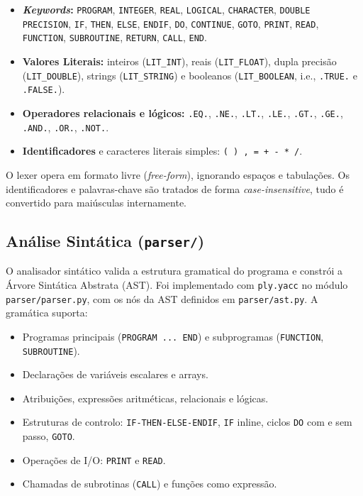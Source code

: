 \documentclass[11pt, a4paper, fleqn]{article}
\begin{document}
\begin{itemize}
    \item \textbf{\textit{Keywords}:} \texttt{PROGRAM}, \texttt{INTEGER}, \texttt{REAL}, \texttt{LOGICAL}, \texttt{CHARACTER}, \texttt{DOUBLE PRECISION}, \texttt{IF}, \texttt{THEN}, \texttt{ELSE}, \texttt{ENDIF}, \texttt{DO}, \texttt{CONTINUE}, \texttt{GOTO}, \texttt{PRINT}, \texttt{READ}, \texttt{FUNCTION}, \texttt{SUBROUTINE}, \texttt{RETURN}, \texttt{CALL}, \texttt{END}.
    \item \textbf{Valores Literais:} inteiros (\texttt{LIT\_INT}), reais (\texttt{LIT\_FLOAT}), dupla precisão (\texttt{LIT\_DOUBLE}), strings (\texttt{LIT\_STRING}) e booleanos (\texttt{LIT\_BOOLEAN}, i.e., \texttt{.TRUE.} e \texttt{.FALSE.}).
    \item \textbf{Operadores relacionais e lógicos:} \texttt{.EQ.}, \texttt{.NE.}, \texttt{.LT.}, \texttt{.LE.}, \texttt{.GT.}, \texttt{.GE.}, \texttt{.AND.}, \texttt{.OR.}, \texttt{.NOT.}.
    \item \textbf{Identificadores} e caracteres literais simples: \texttt{( ) , = + - * /}.
\end{itemize}

\noindent O lexer opera em formato livre (\textit{free-form}), ignorando espaços e tabulações. Os identificadores e palavras-chave são tratados de forma \textit{case-insensitive}, tudo é convertido para maiúsculas internamente.

\subsection{Análise Sintática (\texttt{parser/})}

O analisador sintático valida a estrutura gramatical do programa e constrói a Árvore Sintática Abstrata (AST). Foi implementado com \texttt{ply.yacc} no módulo \texttt{parser/parser.py}, com os nós da AST definidos em \texttt{parser/ast.py}. A gramática suporta:

\begin{itemize}
    \item Programas principais (\texttt{PROGRAM ... END}) e subprogramas (\texttt{FUNCTION}, \texttt{SUBROUTINE}).
    \item Declarações de variáveis escalares e arrays.
    \item Atribuições, expressões aritméticas, relacionais e lógicas.
    \item Estruturas de controlo: \texttt{IF-THEN-ELSE-ENDIF}, \texttt{IF} inline, ciclos \texttt{DO} com e sem passo, \texttt{GOTO}.
    \item Operações de I/O: \texttt{PRINT} e \texttt{READ}.
    \item Chamadas de subrotinas (\texttt{CALL}) e funções como expressão.
\end{itemize}
\end{document}
